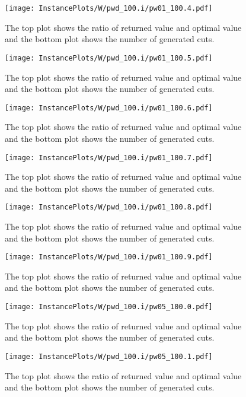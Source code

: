 \documentclass[10pt,a4paper]{article}
\begin{document}
\begin{figure}[H]
\texttt{[image: InstancePlots/W/pwd\_100.i/pw01\_100.4.pdf]}
\caption{The top plot shows the ratio of returned value and optimal value     and the bottom plot shows the number of generated cuts.}
\end{figure}

\begin{figure}[H]
\texttt{[image: InstancePlots/W/pwd\_100.i/pw01\_100.5.pdf]}
\caption{The top plot shows the ratio of returned value and optimal value     and the bottom plot shows the number of generated cuts.}
\end{figure}

\begin{figure}[H]
\texttt{[image: InstancePlots/W/pwd\_100.i/pw01\_100.6.pdf]}
\caption{The top plot shows the ratio of returned value and optimal value     and the bottom plot shows the number of generated cuts.}
\end{figure}

\begin{figure}[H]
\texttt{[image: InstancePlots/W/pwd\_100.i/pw01\_100.7.pdf]}
\caption{The top plot shows the ratio of returned value and optimal value     and the bottom plot shows the number of generated cuts.}
\end{figure}

\begin{figure}[H]
\texttt{[image: InstancePlots/W/pwd\_100.i/pw01\_100.8.pdf]}
\caption{The top plot shows the ratio of returned value and optimal value     and the bottom plot shows the number of generated cuts.}
\end{figure}

\begin{figure}[H]
\texttt{[image: InstancePlots/W/pwd\_100.i/pw01\_100.9.pdf]}
\caption{The top plot shows the ratio of returned value and optimal value     and the bottom plot shows the number of generated cuts.}
\end{figure}

\begin{figure}[H]
\texttt{[image: InstancePlots/W/pwd\_100.i/pw05\_100.0.pdf]}
\caption{The top plot shows the ratio of returned value and optimal value     and the bottom plot shows the number of generated cuts.}
\end{figure}

\begin{figure}[H]
\texttt{[image: InstancePlots/W/pwd\_100.i/pw05\_100.1.pdf]}
\caption{The top plot shows the ratio of returned value and optimal value     and the bottom plot shows the number of generated cuts.}
\end{figure}
\end{document}
